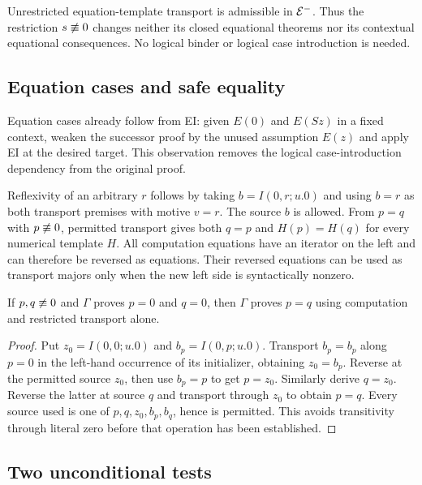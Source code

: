 \begin{theorem}
\label{thm:equational}
Unrestricted equation-template transport is admissible in $\mathcal E^{-}$. Thus the
restriction $s\not\equiv0$ changes neither its closed equational theorems nor
its contextual equational consequences. No logical binder or logical case
introduction is needed.
\end{theorem}

\subsection{Equation cases and safe equality}

Equation cases already follow from EI: given $E(0)$ and $E(Sz)$ in a fixed
context, weaken the successor proof by the unused assumption $E(z)$ and
apply EI at the desired target. This observation removes the logical
case-introduction dependency from the original proof.

Reflexivity of an arbitrary $r$ follows by taking $b=I(0,r;u.0)$ and
using $b=r$ as both transport premises with motive $v=r$. The source $b$
is allowed. From $p=q$ with $p\not\equiv0$, permitted transport gives both
$q=p$ and $H(p)=H(q)$ for every numerical template $H$. All computation
equations have an iterator on the left and can therefore be reversed as
equations. Their reversed equations can be used as transport majors only
when the new left side is syntactically nonzero.

\begin{lemma}
If $p,q\not\equiv0$ and $\Gamma$ proves $p=0$ and $q=0$, then $\Gamma$
proves $p=q$ using computation and restricted transport alone.
\end{lemma}
\begin{proof}
Put $z_0=I(0,0;u.0)$ and $b_p=I(0,p;u.0)$. Transport $b_p=b_p$
along $p=0$ in the left-hand occurrence of its initializer, obtaining
$z_0=b_p$. Reverse at the permitted source $z_0$, then use $b_p=p$
to get $p=z_0$. Similarly derive $q=z_0$. Reverse the latter at source
$q$ and transport through $z_0$ to obtain $p=q$. Every source used is
one of $p,q,z_0,b_p,b_q$, hence is permitted. This avoids transitivity
through literal zero before that operation has been established.
\end{proof}

\subsection{Two unconditional tests}

